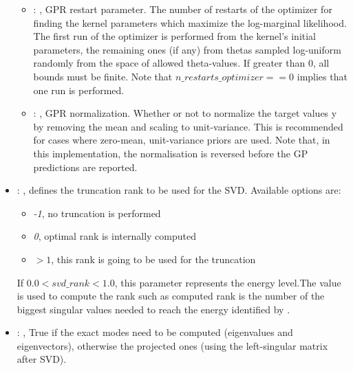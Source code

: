 \begin{itemize}
\begin{itemize}
        \item {}: ,
          GPR restart parameter. The number of restarts of the optimizer for finding the
          kernel parameters which maximize the log-marginal likelihood. The first run of the
          optimizer                                                  is performed from the kernel’s
          initial parameters, the remaining ones (if any) from thetas
          sampled log-uniform randomly from the space of allowed theta-values. If greater than 0,
          all bounds must be finite. Note that $n\_restarts\_optimizer == 0$ implies that one run is
          performed.

        \item {}: ,
          GPR normalization. Whether or not to normalize the target values y by removing the mean
          and scaling                                                  to unit-variance. This is
          recommended for cases where zero-mean, unit-variance priors are used.
          Note that, in this implementation, the normalisation is reversed before the GP predictions
          are reported.
      \end{itemize}

    \item {}: ,
      defines the truncation rank to be used for the SVD.
      Available options are:                                                  \begin{itemize}
      \item \textit{-1}, no truncation is performed
      \item \textit{0}, optimal rank is internally computed
      \item \textit{$>1$}, this rank is going to be used for the truncation
      \end{itemize}                                                  If $0.0 < svd\_rank < 1.0$, this
      parameter represents the energy level.The value is used to compute the rank such
      as computed rank is the number of the biggest singular values needed to reach the energy
      identified by                                                    .

    \item {}: ,
      True if the exact modes need to be computed (eigenvalues and
      eigenvectors),   otherwise the projected ones (using the left-singular matrix after SVD).


\end{itemize}
